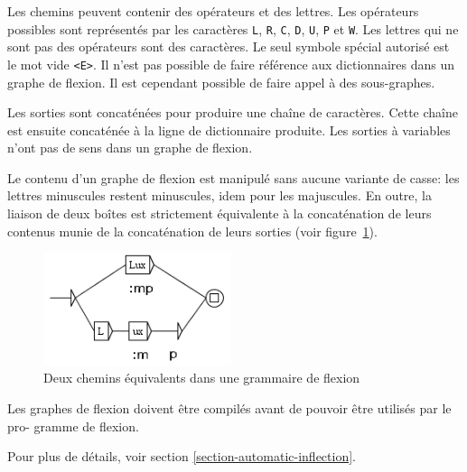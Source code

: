 \noindent Les chemins peuvent contenir des opérateurs et des lettres. Les opérateurs possibles
sont représentés par les caractères \verb+L+, \verb+R+, \verb+C+, \verb+D+, \verb+U+, \verb+P+ et
\verb+W+.
Les lettres qui ne sont pas des opérateurs sont des caractères. Le seul symbole spécial autorisé est
le mot vide \verb+<E>+. Il n’est pas possible de faire référence aux dictionnaires
dans un graphe de flexion. Il est cependant possible de
faire appel à des sous-graphes.

\bigskip
\noindent Les sorties sont concaténées pour produire une chaîne de caractères. Cette chaîne est
ensuite concaténée à la ligne de dictionnaire produite. Les sorties à variables n’ont pas de
sens dans un graphe de flexion.


\bigskip
\noindent Le contenu d’un graphe de flexion est manipulé sans aucune variante de casse: les lettres
minuscules restent minuscules, idem pour les majuscules. En outre, la liaison de deux boîtes
est strictement équivalente à la concaténation de leurs contenus munie de la concaténation
de leurs sorties (voir figure~\ref{fig-equivalent-inflection-paths}).

\bigskip
\begin{figure}[!ht]
\begin{center}
\includegraphics[width=5.5cm]{resources/img/fig6-2.png}
\caption{Deux chemins équivalents dans une grammaire de flexion\label{fig-equivalent-inflection-paths}}
\end{center}
\end{figure}

\bigskip
\noindent Les graphes de flexion doivent être compilés avant de pouvoir être utilisés par le pro-
gramme de flexion.


\bigskip
\noindent Pour plus de détails, voir section
\ref{section-automatic-inflection}.

